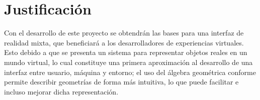 \section{Justificación}

	Con el desarrollo de este proyecto se obtendrán las bases para una interfaz de realidad mixta, que beneficiará a los desarrolladores de experiencias virtuales. Esto debido a que se presenta un sistema para representar objetos reales en un mundo virtual, lo cual constituye una primera aproximación al desarrollo de una interfaz entre usuario, máquina y entorno; el uso del álgebra geométrica conforme permite describir geometrías de forma más intuitiva, lo que puede facilitar e incluso mejorar dicha representación.  
